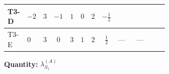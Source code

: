 \documentclass[8pt]{article}
\begin{document}
\begin{landscape}
\begin{longtable}{@{}llcccccc >{\raggedright\arraybackslash}p{0.21\linewidth} >{\raggedright\arraybackslash}p{0.21\linewidth} >{\raggedright\arraybackslash}p{0.21\linewidth}@{}}
T3-D & $-2$ & $3$ & $-1$ & $1$ & $0$ & $2$ & $-\frac{1}{2}$ & \scriptsize\adjustbox{max width=\linewidth}{$\begin{gathered} +\frac{3 {g_1}^4}{2}\end{gathered}$} & \scriptsize\adjustbox{max width=\linewidth}{$\begin{gathered} +\frac{{\lambda_{12}^{(1)}}^2}{4}\end{gathered}$} & \scriptsize\adjustbox{max width=\linewidth}{$\begin{gathered} +\frac{{\lambda_{HS_1}^{(1)}}^2}{2}\end{gathered}$} \\
\midrule
T3-E & $0$ & $3$ & $0$ & $3$ & $1$ & $2$ & $\frac{1}{2}$ & --- & --- & \scriptsize\adjustbox{max width=\linewidth}{$\begin{gathered} +\frac{{\lambda_{HS_1}^{(1)}}^2}{2}\end{gathered}$} \\
\midrule
\bottomrule
\end{longtable}
\clearpage
\noindent\textbf{Quantity: }$\lambda_{S_1}^{(A)}$\par\smallskip

\end{landscape}
\end{document}
